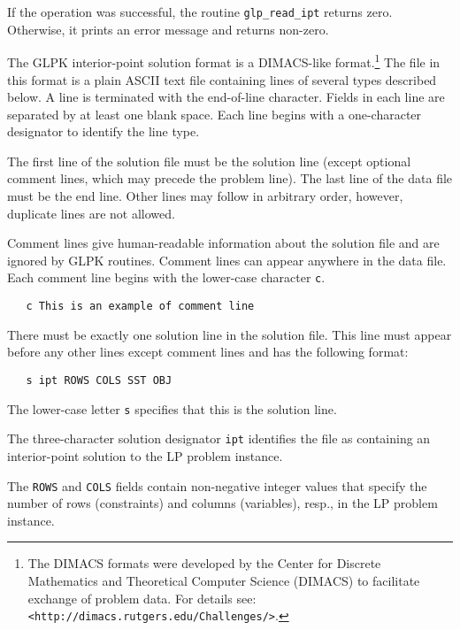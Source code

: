 
\returns

If the operation was successful, the routine \verb|glp_read_ipt|
returns zero. Otherwise, it prints an error message and returns
non-zero.


The GLPK interior-point solution format is a DIMACS-like
format.\footnote{The DIMACS formats were developed by the Center for
Discrete Mathematics and Theoretical Computer Science (DIMACS) to
facilitate exchange of problem data. For details see:
{\tt <http://dimacs.rutgers.edu/Challenges/>}. }
The file in this format is a plain ASCII text file containing lines of
several types described below. A line is terminated with the
end-of-line character. Fields in each line are separated by at least
one blank space. Each line begins with a one-character designator to
identify the line type.

The first line of the solution file must be the solution line (except
optional comment lines, which may precede the problem line). The last
line of the data file must be the end line. Other lines may follow in
arbitrary order, however, duplicate lines are not allowed.

 Comment lines give human-readable information
about the solution file and are ignored by GLPK routines. Comment lines
can appear anywhere in the data file. Each comment line begins with the
lower-case character \verb|c|.

\begin{verbatim}
   c This is an example of comment line
\end{verbatim}

 There must be exactly one solution line in the
solution file. This line must appear before any other lines except
comment lines and has the following format:

\begin{verbatim}
   s ipt ROWS COLS SST OBJ
\end{verbatim}

The lower-case letter \verb|s| specifies that this is the solution
line.

The three-character solution designator \verb|ipt| identifies the file
as containing an interior-point solution to the LP problem instance.

The \verb|ROWS| and \verb|COLS| fields contain non-negative integer
values that specify the number of rows (constraints) and columns
(variables), resp., in the LP problem instance.


